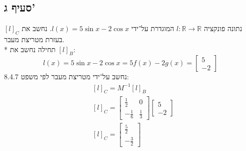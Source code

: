 \documentclass[a4paper]{article}
\def\RR{\mathbb{R}}
\begin{document}
\subsection{סעיף ג'}
נתונה פונקציה $l: \RR \to \RR$ המוגדרת על־ידי
$l(x) = 5 \sin x - 2 \cos x$.
נחשב את ${[l]}_C$ בעזרת מטריצת מעבר. \\*
תחילה נחשב את ${[l]}_B$:
\[
	l(x) = 5 \sin x - 2 \cos x = 5 f(x) - 2 g(x) =
	\begin{bmatrix} 5 \\ -2 \end{bmatrix}
\]
נחשב על־ידי מטריצת מעבר לפי משפט 8.4.7:
\begin{align*}
	& {[l]}_C = M^{-1} {[l]}_B \\
	& {[l]}_C =
	\begin{bmatrix}
		{\frac{1}{2}} & 0 \\
		-{\frac{1}{6}} & {\frac{1}{3}}
	\end{bmatrix}
	\begin{bmatrix} 5 \\ -2 \end{bmatrix} \\
	& {[l]}_C =
	\begin{bmatrix}
		{\frac{5}{2}} \\
		-{\frac{3}{2}}
	\end{bmatrix}
\end{align*}
\end{document}
